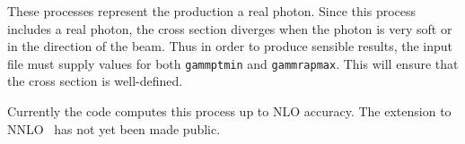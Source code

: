 \label{subsec:dirphot}

These processes represent the production a real photon.  Since this
process includes a real photon, the cross section diverges when the
photon is very soft or in the direction of the beam.  Thus in order to
produce sensible results, the input file must supply values for both
{\tt gammptmin} and {\tt gammrapmax}. This will ensure that
the cross section is well-defined.

Currently the code computes this process up to NLO accuracy.  The
extension to NNLO~\cite{Campbell:2016lzl,Campbell:2017dqk,Campbell:2018wfu}
has not yet been made public.
